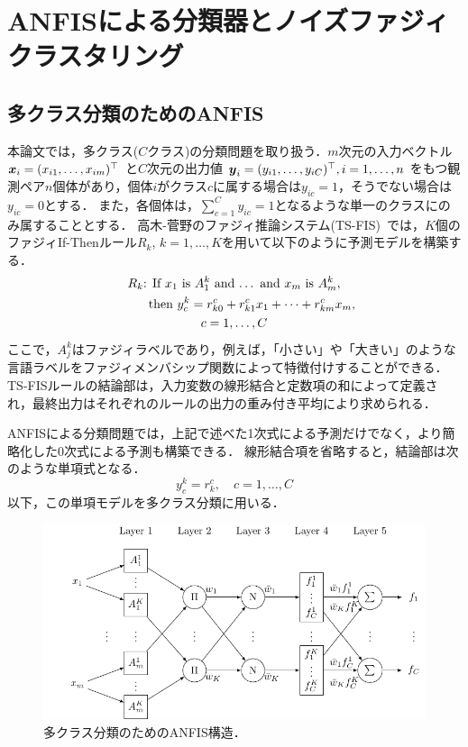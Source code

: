 \documentclass{ujarticle}
\begin{document}
\section{ANFISによる分類器とノイズファジィクラスタリング}
\subsection{多クラス分類のためのANFIS}
本論文では，多クラス($C$クラス)の分類問題を取り扱う．$m$次元の入力ベクトル
$\mbox{\boldmath $x$}_i=(x_{i1}, \dots, x_{im})^\top$
と$C$次元の出力値
$\mbox{\boldmath $y$}_i=(y_{i1}, \dots, y_{iC})^\top, i=1, \dots, n$
をもつ観測ペア$n$個体があり，個体$i$がクラス$c$に属する場合は$y_{ic}=1$，そうでない場合は$y_{ic}=0$とする．
また，各個体は，$\sum_{c=1}^C y_{ic} =1$となるような単一のクラスにのみ属することとする．
高木-菅野のファジィ推論システム(TS-FIS)~\cite{Takagi1985}では，$K$個のファジィIf-Thenルール$R_k$, $k=1, \dots, K$を用いて以下のように予測モデルを構築する．
\begin{multline}
  \text{$R_k$: If $x_1$ is $A_1^k$ and $\dots$ and $x_m$ is $A_m^k$},\\
  \hspace{10mm}\text{then $y_c^k = r_{k0}^c + r_{k1}^c x_1 + \dots + r_{km}^c x_m$},\\
  c=1, \dots, C
\end{multline}
ここで，$A_j^k$はファジィラベルであり，例えば，「小さい」や「大きい」のような言語ラベルをファジィメンバシップ関数によって特徴付けすることができる．
TS-FISルールの結論部は，入力変数の線形結合と定数項の和によって定義され，最終出力はそれぞれのルールの出力の重み付き平均により求められる．

ANFISによる分類問題では，上記で述べた1次式による予測だけでなく，より簡略化した0次式による予測も構築できる\cite{Angelov2008}．
線形結合項を省略すると，結論部は次のような単項式となる．
\begin{equation}
  y_{c}^{k}=r_{k}^{c}, \quad c=1, \dots, C
\end{equation}
以下，この単項モデルを多クラス分類に用いる．

\begin{figure}[htbp]
\centering
	\includegraphics[width=\hsize]{anfis_architecture_classification.pdf}
\caption{\label{fig: ANFIS_architecture}多クラス分類のためのANFIS構造．}
\end{figure}
\end{document}
